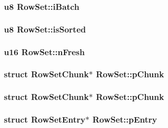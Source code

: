 \subsubsection{\setlength{\rightskip}{0pt plus 5cm}\bf{u8} \bf{Row\-Set::i\-Batch}}\label{structRowSet_9f530064bbd4f6dec1f343384b7fbb03}


\subsubsection{\setlength{\rightskip}{0pt plus 5cm}\bf{u8} \bf{Row\-Set::is\-Sorted}}\label{structRowSet_12c7b1db819d0f6b66932138b05299f7}


\subsubsection{\setlength{\rightskip}{0pt plus 5cm}\bf{u16} \bf{Row\-Set::n\-Fresh}}\label{structRowSet_b7acb3bab1befbd959197996a1c7801f}


\subsubsection{\setlength{\rightskip}{0pt plus 5cm}struct \bf{Row\-Set\-Chunk}$\ast$ \bf{Row\-Set::p\-Chunk}}\label{structRowSet_340d626319fcf22ee3411ee8b8bad6ff}


\subsubsection{\setlength{\rightskip}{0pt plus 5cm}struct \bf{Row\-Set\-Chunk}$\ast$ \bf{Row\-Set::p\-Chunk}}\label{structRowSet_340d626319fcf22ee3411ee8b8bad6ff}


\subsubsection{\setlength{\rightskip}{0pt plus 5cm}struct \bf{Row\-Set\-Entry}$\ast$ \bf{Row\-Set::p\-Entry}}\label{structRowSet_7b7cb44d5fe17e142c1b07569909bf75}


